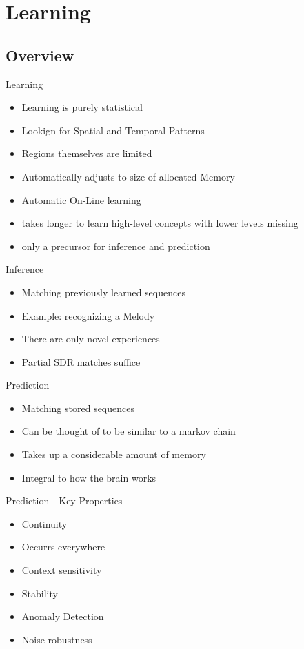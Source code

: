 \section{Learning}

\subsection{Overview}

\begin{frame}[c]{Learning}
    \begin{itemize}[<+(1)->]
        \item Learning is purely statistical
        \item Lookign for Spatial and Temporal Patterns
        \item Regions themselves are limited
        \item Automatically adjusts to size of allocated Memory
        \item Automatic On-Line learning
        \item takes longer to learn high-level concepts with lower levels missing
        \item only a precursor for inference and prediction
    \end{itemize}
\end{frame}


\begin{frame}[c]{Inference}
    \Large
    \begin{itemize}[<+(1)->]
        \item Matching previously learned sequences
        \item Example: recognizing a Melody
        \item There are only novel experiences
        \item Partial SDR matches suffice
    \end{itemize}
\end{frame}


\begin{frame}[c]{Prediction}
    \Large
    \begin{itemize}[<+(1)->]
        \item Matching stored sequences
        \item Can be thought of to be similar to a markov chain
        \item Takes up a considerable amount of memory
        \item Integral to how the brain works
    \end{itemize}
\end{frame}


\begin{frame}[c]{Prediction - Key Properties}
    \Large
    \begin{itemize}[<+(1)->]
        \item Continuity
        \item Occurrs everywhere
        \item Context sensitivity
        \item Stability
        \item Anomaly Detection
        \item Noise robustness
    \end{itemize}
\end{frame}




